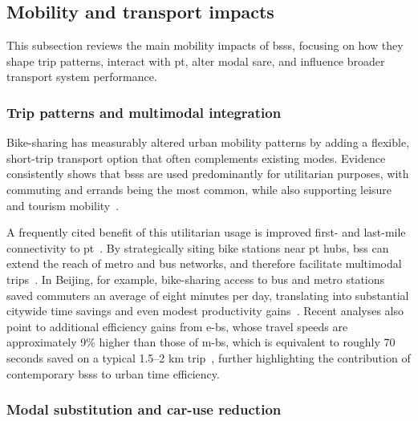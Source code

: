 \subsection{Mobility and transport impacts}
\label{sec:mobility_and_transport_impacts}

This subsection reviews the main mobility impacts of \acp{bss}, focusing on how they shape trip patterns, interact with \ac{pt}, alter modal sare, and influence broader transport system performance.

    \subsubsection{Trip patterns and multimodal integration}

Bike-sharing has measurably altered urban mobility patterns by adding a flexible, short-trip transport option that often complements existing modes. Evidence consistently shows that \acp{bss} are used predominantly for utilitarian purposes, with commuting and errands being the most common, while also supporting leisure and tourism mobility~\cite{Ricci2015}.

A frequently cited benefit of this utilitarian usage is improved first- and last-mile connectivity to \ac{pt}~\cite{Shaheen2010, Qiu2018}. By strategically siting bike stations near \ac{pt} hubs, \ac{bss} can extend the reach of metro and bus networks, and therefore facilitate multimodal trips~\cite{Cheng2022}. In Beijing, for example, bike-sharing access to bus and metro stations saved commuters an average of eight minutes per day, translating into substantial citywide time savings and even modest productivity gains~\cite{Qiu2018}. Recent analyses also point to additional efficiency gains from \acp{e-b}, whose travel speeds are approximately 9\% higher than those of \acp{m-b}, which is equivalent to roughly 70 seconds saved on a typical 1.5–2 km trip~\cite{Waldner2025}, further highlighting the contribution of contemporary \acp{bss} to urban time efficiency. 

\subsubsection{Modal substitution and car-use reduction}

